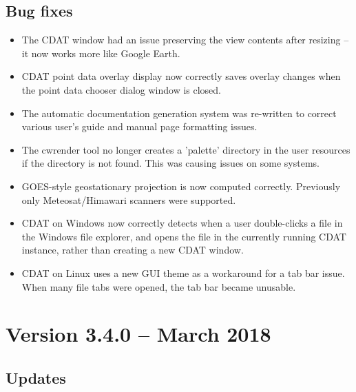 \subsection*{ Bug fixes}
\begin{itemize}

  \item The CDAT window had an issue preserving the view contents after
  resizing -- it now works more like Google Earth.

  \item CDAT point data overlay display now correctly saves overlay changes
  when the point data chooser dialog window is closed.

  \item The automatic documentation generation system was re-written to
  correct various user's guide and manual page formatting issues.

  \item The cwrender tool no longer creates a 'palette' directory in the
  user resources if the directory is not found.  This was causing issues
  on some systems.

  \item GOES-style geostationary projection is now computed correctly.
  Previously only Meteosat/Himawari scanners were supported.

  \item CDAT on Windows now correctly detects when a user double-clicks
  a file in the Windows file explorer, and opens the file in the currently
  running CDAT instance, rather than creating a new CDAT window.

  \item CDAT on Linux uses a new GUI theme as a workaround for a tab bar
  issue.  When many file tabs were opened, the tab bar became unusable.

\end{itemize}


\section{Version 3.4.0 -- March 2018}

\subsection*{ Updates}

